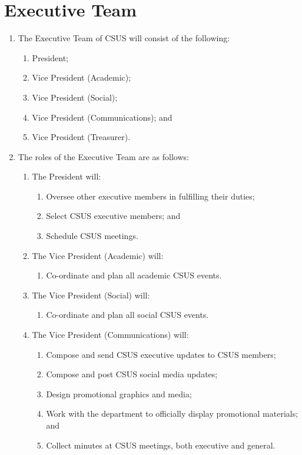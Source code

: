 \documentclass{article}
\begin{document}
\section{Executive Team}
\begin{enumerate}
	\item The Executive Team of CSUS will consist of the following:
	\begin{enumerate}
		\item President;
		\item Vice President (Academic);
		\item Vice President (Social);
		\item Vice President (Communications); and
		\item Vice President (Treasurer).
	\end{enumerate}
	\item The roles of the Executive Team are as follows:
	\begin{enumerate}
		\item The President will:
		\begin{enumerate}
			\item Oversee other executive members in fulfilling their duties;
			\item Select CSUS executive members; and
			\item Schedule CSUS meetings.
		\end{enumerate}
		\item The Vice President (Academic) will:
		\begin{enumerate}
			\item Co-ordinate and plan all academic CSUS events.
		\end{enumerate}
		\item The Vice President (Social) will:
		\begin{enumerate}
			\item Co-ordinate and plan all social CSUS events.
		\end{enumerate}
		\item The Vice President (Communications) will:
		\begin{enumerate}
			\item Compose and send CSUS executive updates to CSUS members;
			\item Compose and post CSUS social media updates;
			\item Design promotional graphics and media;
			\item Work with the department to officially display promotional materials; and
			\item Collect minutes at CSUS meetings, both executive and general.

\end{enumerate}
\end{enumerate}
\end{enumerate}
\end{document}
